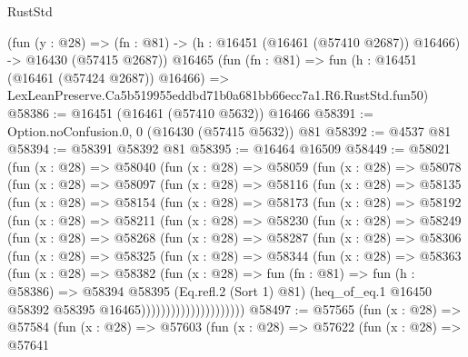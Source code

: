 \begin{lexlean}{RustStd}
\begin{coremodule}
    (fun (y : @28) =>
    (fn : @81) -> (h : @16451 (@16461 (@57410 @2687)) @16466) -> @16430 (@57415 @2687))
    @16465
    (fun (fn : @81) =>
    fun (h : @16451 (@16461 (@57424 @2687)) @16466) =>
    LexLeanPreserve.Ca5b519955eddbd71b0a681bb66ecc7a1.R6.RustStd.fun50)
@58386 := @16451 (@16461 (@57410 @5632)) @16466
@58391 := Option.noConfusion.{0, 0} (@16430 (@57415 @5632)) @81
@58392 := @4537 @81
@58394 := @58391 @58392 @81
@58395 := @16464 @16509
@58449 := @58021
    (fun (x : @28) =>
    @58040
      (fun (x : @28) =>
      @58059
        (fun (x : @28) =>
        @58078
          (fun (x : @28) =>
          @58097
            (fun (x : @28) =>
            @58116
              (fun (x : @28) =>
              @58135
                (fun (x : @28) =>
                @58154
                  (fun (x : @28) =>
                  @58173
                    (fun (x : @28) =>
                    @58192
                      (fun (x : @28) =>
                      @58211
                        (fun (x : @28) =>
                        @58230
                          (fun (x : @28) =>
                          @58249
                            (fun (x : @28) =>
                            @58268
                              (fun (x : @28) =>
                              @58287
                                (fun (x : @28) =>
                                @58306
                                  (fun (x : @28) =>
                                  @58325
                                    (fun (x : @28) =>
                                    @58344
                                      (fun (x : @28) =>
                                      @58363
                                        (fun (x : @28) =>
                                        @58382
                                          (fun (x : @28) =>
                                          fun (fn : @81) =>
                                          fun (h : @58386) =>
                                          @58394
                                            @58395
                                            (Eq.refl.{2} (Sort 1) @81)
                                            (heq_of_eq.{1}
                                              @16450
                                              @58392
                                              @58395
                                              @16465)))))))))))))))))))))
@58497 := @57565
    (fun (x : @28) =>
    @57584
      (fun (x : @28) =>
      @57603
        (fun (x : @28) =>
        @57622
          (fun (x : @28) =>
          @57641

\end{coremodule}
\end{lexlean}
